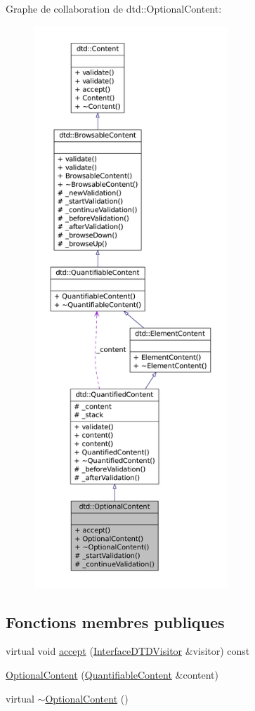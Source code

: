 Graphe de collaboration de dtd::OptionalContent:\nopagebreak
\begin{figure}[H]
\begin{center}
\leavevmode
\includegraphics[height=600pt]{classdtd_1_1_optional_content__coll__graph}
\end{center}
\end{figure}
\subsection*{Fonctions membres publiques}
\begin{DoxyCompactItemize}
\item 
virtual void \hyperlink{classdtd_1_1_optional_content_a215be42249f1e54da514fdfc386ba21c}{accept} (\hyperlink{classdtd_1_1_interface_d_t_d_visitor}{InterfaceDTDVisitor} \&visitor) const 
\item 
\hyperlink{classdtd_1_1_optional_content_a93352de3e78f5279a80d19ae81ca7b71}{OptionalContent} (\hyperlink{classdtd_1_1_quantifiable_content}{QuantifiableContent} \&content)
\item 
virtual \hyperlink{classdtd_1_1_optional_content_aa10ed10083345b853a69319b79191e0d}{$\sim$OptionalContent} ()
\end{DoxyCompactItemize}
